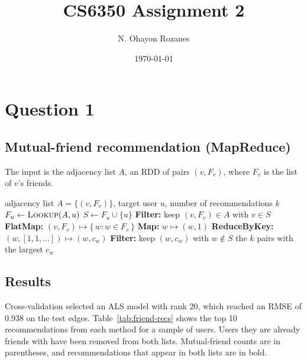 \documentclass[11pt]{article}
\title{CS6350 Assignment 2}
\author{N. Ohayon Rozanes}
\date{\today}
\begin{document}
\maketitle

\section{Question 1}

\subsection*{Mutual-friend recommendation (MapReduce)}
The input is the adjacency list $A$, an RDD of pairs $(v, F_v)$,
where $F_v$ is the list of $v$'s friends.

\begin{algorithm}[H]
  \caption{\textsc{FriendRec}$(A, u, k)$: first-order friend recommendations}
  \begin{algorithmic}[1]
    \REQUIRE adjacency list $A = \{(v, F_v)\}$, target user $u$,
    number of recommendations $k$
    \STATE $F_u \leftarrow \textsc{Lookup}(A, u)$ 
    \STATE $S \leftarrow F_u \cup \{u\}$ 
    \STATE \textbf{Filter:} keep $(v, F_v) \in A$ with $v \in S$
    \STATE \textbf{FlatMap:} $(v, F_v) \mapsto \{\, w : w \in F_v
    \,\}$ 
    \STATE \textbf{Map:} $w \mapsto (w, 1)$
    \STATE \textbf{ReduceByKey:} $(w, [1, 1, \dots]) \mapsto (w,
    c_w)$ 
    \STATE \textbf{Filter:} keep $(w, c_w)$ with $w \notin S$
    \RETURN the $k$ pairs with the largest $c_w$
  \end{algorithmic}
\end{algorithm}
\subsection*{Results}
Cross-validation selected an ALS model with rank 20, which reached an
RMSE of 0.938 on the test edges.
Table~\ref{tab:friend-recs} shows the top 10 recommendations from
each method for a sample of users. Users they are already friends
with have been removed from both lists.
Mutual-friend counts are in parentheses, and recommendations that
appear in both lists are in bold.
\end{document}
